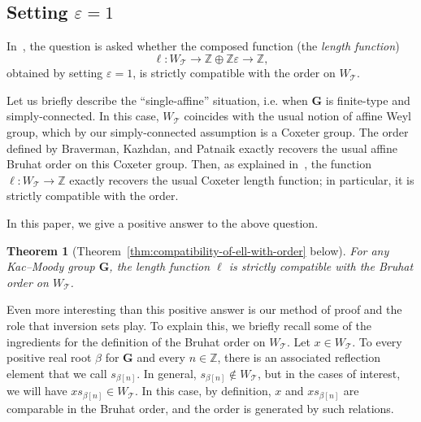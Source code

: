 \documentclass[10pt]{amsart}
\newtheorem{theo}{Theorem}[section]
\newcommand{\eps}{\varepsilon}\newcommand{\ZZ}{\mathbb{Z}}\newcommand{\QQ}{\mathbb{Q}}\newcommand{\RR}{\mathbb{R}}\newcommand{\bB}{\mathbf{B}}\newcommand{\bG}{\mathbf{G}}\newcommand{\cO}{\mathcal{O}}\newcommand{\cS}{\mathcal{S}}\newcommand{\cT}{\mathcal{T}}\newcommand{\WTits}{W_{\cT}}\newcommand{\TitsCone}{\cT}\newcommand{\betacheck}{\beta^\vee}\newcommand{\Inv}{\operatorname{Inv}}\newcommand{\height}{\operatorname{ht}}\newcommand{\im}{\operatorname{image}}\newcommand{\sgn}{\operatorname{sgn}}\newcommand{\tDelta}{\widetilde{\Delta}}\newcommand{\Invplusplusx}{\Inv^{++}_x}\newcommand{\tr}{\widetilde{r}}\newcommand{\tn}{\widetilde{n}}\newcommand{\fl}{\mathfrak{l}}\newcommand{\fs}{\mathfrak{s}}\newcommand{\mk}{\mkern -1mu}\newcommand{\Mk}{\mkern -2mu}\newcommand{\mK}{\mkern 1mu}\newcommand{\MK}{\mkern 2mu}
\begin{document}
\subsection{Setting \texorpdfstring{$\eps=1$}{epsilon=1}}

In~\cite[Question~5.10]{M}, the question is asked whether the composed function (the \emph{length function})
\begin{equation}\label{eq:23}
\ell : \WTits \rightarrow \ZZ \oplus \ZZ \eps \rightarrow \ZZ,
\end{equation}
obtained by setting $\varepsilon=1$, is strictly compatible with the order on $\WTits$.

Let us briefly describe the ``single-affine'' situation, i.e. when $\bG$ is finite-type and simply-connected. In this case, $\WTits$ coincides with the usual notion of affine Weyl group, which by our simply-connected assumption is a Coxeter group. The order defined by Braverman, Kazhdan, and Patnaik exactly recovers the usual affine Bruhat order on this Coxeter group. Then, as explained in~\cite{M}, the function $\ell: \WTits \rightarrow \ZZ$ exactly recovers the usual Coxeter length function; in particular, it is strictly compatible with the order.

In this paper, we give a positive answer to the above question.

\begin{theo}[Theorem~\ref{thm:compatibility-of-ell-with-order} below]
For any Kac--Moody group $\bG$, the length function $\ell$ is strictly compatible with the Bruhat order on $\WTits$.
\end{theo}

Even more interesting than this positive answer is our method of proof and the role that inversion sets play. To explain this, we briefly recall some of the ingredients for the definition of the Bruhat order on $\WTits$. Let $x \in \WTits$. To every positive real root $\beta$ for $\bG$ and every $n \in \ZZ$, there is an associated reflection element that we call $s_{\beta[n]}$. In general, $s_{\beta[n]} \notin \WTits$, but in the cases of interest, we will have $ x s_{\beta[n]} \in \WTits$. In this case, by definition, $x$ and $ x s_{\beta[n]}$ are comparable in the Bruhat order, and the order is generated by such relations.
\end{document}

